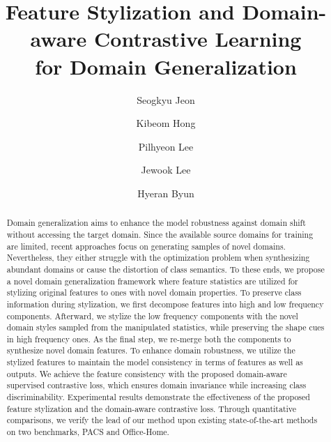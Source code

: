 \documentclass[sigconf]{acmart}
\begin{document}
\title{Feature Stylization and Domain-aware Contrastive Learning\\for Domain Generalization}

\renewcommand{\shorttitle}{Feature Stylization and Domain-aware Contrastive Learning for Domain Generalization}




\author{Seogkyu Jeon}

\author{Kibeom Hong}

\author{Pilhyeon Lee}

\author{Jewook Lee}

\author{Hyeran Byun}








\begin{abstract}
Domain generalization aims to enhance the model robustness against domain shift without accessing the target domain. Since the available source domains for training are limited, recent approaches focus on generating samples of novel domains. Nevertheless, they either struggle with the optimization problem when synthesizing abundant domains or cause the distortion of class semantics. To these ends, we propose a novel domain generalization framework where feature statistics are utilized for stylizing original features to ones with novel domain properties. To preserve class information during stylization, we first decompose features into high and low frequency components. Afterward, we stylize the low frequency components with the novel domain styles sampled from the manipulated statistics, while preserving the shape cues in high frequency ones. As the final step, we re-merge both the components to synthesize novel domain features.
To enhance domain robustness, we utilize the stylized features to maintain the model consistency in terms of features as well as outputs.
We achieve the feature consistency with the proposed domain-aware supervised contrastive loss, which ensures domain invariance while increasing class discriminability.
Experimental results demonstrate the effectiveness of the proposed feature stylization and the domain-aware contrastive loss.
Through quantitative comparisons, we verify the lead of our method upon existing state-of-the-art methods on two benchmarks, PACS and Office-Home.
\end{abstract}
\end{document}
